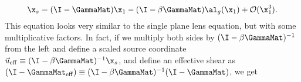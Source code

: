 \begin{equation}
\label{eqn:background}
\x_s = (\I - \GammaMat) \x_1  - (\I - \beta \GammaMat)\al_g(\x_1) + \mathcal{O}(\x_1^3).
\end{equation}
This equation looks very similar to the single plane lens equation, but with some multiplicative factors. In fact, if we multiply both sides by $(\I - \beta \GammaMat)^{-1}$ from the left and define a scaled source coordinate $\vec{u}_{\rm eff} \equiv (\I - \beta \GammaMat)^{-1} \x_s$, and define an effective shear as $(\I -\GammaMat_{\rm eff}) \equiv (\I - \beta\GammaMat)^{-1} (\I - \GammaMat)$, we get
  
  
  